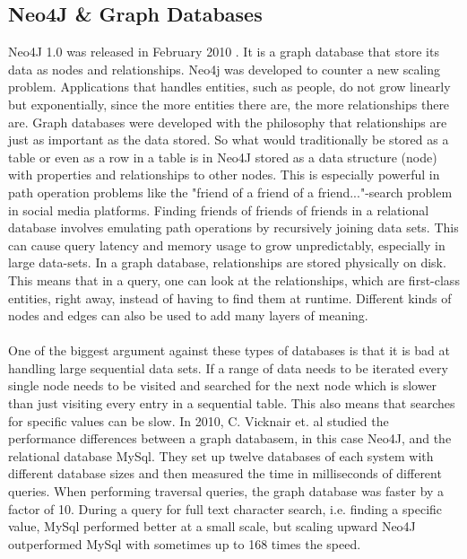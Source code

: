 \documentclass{cslthse-msc}
\begin{document}
\subsection{Neo4J \& Graph Databases}
Neo4J 1.0 was released in February 2010 \cite{Neo4J10}. It is a graph database that store its data as nodes and relationships. Neo4j was developed to counter a new scaling problem. Applications that handles entities, such as people, do not grow linearly but exponentially, since the more entities there are, the more relationships there are. Graph databases were developed with the philosophy that relationships are just as important as the data stored. So what would traditionally be stored as a table or even as a row in a table is in Neo4J stored as a data structure (node) with properties and relationships to other nodes. This is especially powerful in path operation problems like the "friend of a friend of a friend..."-search problem in social media platforms. Finding friends of friends of friends in a relational database involves emulating path operations by recursively joining data sets. This can cause query latency and memory usage to grow unpredictably, especially in large data-sets. In a graph database, relationships are stored physically on disk. This means that in a query, one can look at the relationships, which are first-class entities, right away, instead of having to find them at runtime. Different kinds of nodes and edges can also be used to add many layers of meaning. \\\\
One of the biggest argument against these types of databases is that it is bad at handling  large sequential data sets. If a range of data needs to be iterated every single node needs to be visited and searched for the next node which is slower than just visiting every entry in a sequential table. This also means that searches for specific values can be slow. In 2010, C. Vicknair et. al \cite{vicknair2010comparison} studied the performance differences between a graph databasem, in this case Neo4J, and the relational database MySql. They set up twelve databases of each system with different database sizes and then measured the time in milliseconds of different queries. When performing traversal queries, the graph database was faster by a factor of 10. During a query for full text character search, i.e. finding a specific value, MySql performed better at a small scale, but scaling upward Neo4J outperformed MySql with sometimes up to 168 times the speed.
\end{document}
